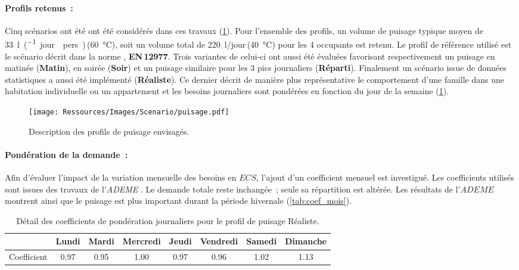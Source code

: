 \paragraph{Profils retenus~:} %
\label{par:profils_retenus}
Cinq scénarios ont été ont été considérés dans ces travaux (\ref{fig:profil_puisage}).
Pour l’ensemble des profils, un volume de puisage typique moyen de
\SI{33}{\litre\per(jour\period pers)}\,(\SI{60}{\celsius}), soit un
volume total de \SI{220}{\litre/jour}\,(\SI{40}{\celsius}) pour les 4 occupants est
retenu. Le profil de référence utilisé est le scénario décrit dans la norme
\textcite{EN129771}, \textbf{EN\,12977}. Trois variantes de celui-ci ont aussi été évaluées favorisant
respectivement un puisage en matinée (\textbf{Matin}), en soirée (\textbf{Soir}) et un
puisage similaire pour les 3 pics journaliers (\textbf{Réparti}). Finalement un scénario
issue de données statistiques \parencite{ADEME2016} a aussi été implémenté
(\textbf{Réaliste}). Ce dernier décrit de manière plus représentative le comportement
d’une famille dans une habitation individuelle ou un appartement et les besoins
journaliers sont pondérées en fonction du jour de la semaine (\ref{tab:coef_semaine}).
\begin{figure}
    \begin{center}
        \texttt{[image: Ressources/Images/Scenario/puisage.pdf]}
    \end{center}
    \caption{Description des profils de puisage envisagés.
             \label{fig:profil_puisage}}
\end{figure}

\paragraph{Pondération de la demande~:} %
\label{par:ponderation_de_la_demande}
Afin d’évaluer l’impact de la variation mensuelle des besoins en $ECS$, l’ajout d’un
coefficient mensuel est investigué. Les coefficients utilisés sont issues des travaux de
l’\emph{ADEME} \parencite{ADEME2016}. Le demande totale reste inchangée~; seule sa
répartition est altérée. Les résultats de l’$ADEME$ montrent ainsi que le puisage est plus
important durant la période hivernale (\ref{tab:coef_mois}).

\begin{table}
\centering
\begin{tabular}{l*{7}{c}}
    \toprule
                & Lundi & Mardi & Mercredi & Jeudi & Vendredi & Samedi & Dimanche \\
    \midrule
    Coefficient & \num{0.97}  & \num{0.95}  & \num{1.00}     & \num{0.97}  & \num{0.96}     & \num{1.02}   & \num{1.13}     \\
    \bottomrule
\end{tabular}
\caption{Détail des coefficients de pondération journaliers pour le profil de
         puisage Réaliste.}
         \label{tab:coef_semaine}
\end{table}

